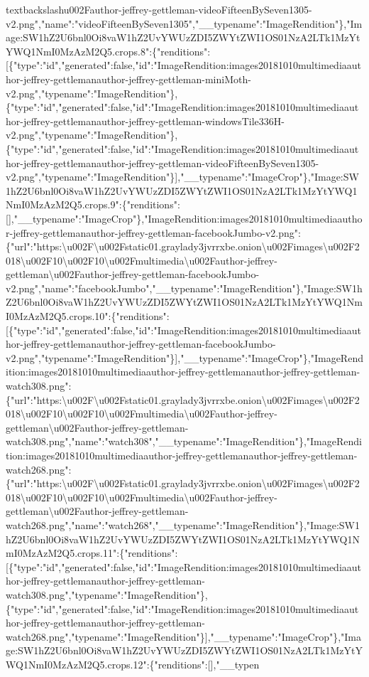 textbackslash{}u002Fauthor-jeffrey-gettleman-videoFifteenBySeven1305-v2.png","name":"videoFifteenBySeven1305","\_\_typename":"ImageRendition"\},"Image:SW1hZ2U6bnl0Oi8vaW1hZ2UvYWUzZDI5ZWYtZWI1OS01NzA2LTk1MzYtYWQ1NmI0MzAzM2Q5.crops.8":\{"renditions":{[}\{"type":"id","generated":false,"id":"ImageRendition:images20181010multimediaauthor-jeffrey-gettlemanauthor-jeffrey-gettleman-miniMoth-v2.png","typename":"ImageRendition"\},\{"type":"id","generated":false,"id":"ImageRendition:images20181010multimediaauthor-jeffrey-gettlemanauthor-jeffrey-gettleman-windowsTile336H-v2.png","typename":"ImageRendition"\},\{"type":"id","generated":false,"id":"ImageRendition:images20181010multimediaauthor-jeffrey-gettlemanauthor-jeffrey-gettleman-videoFifteenBySeven1305-v2.png","typename":"ImageRendition"\}{]},"\_\_typename":"ImageCrop"\},"Image:SW1hZ2U6bnl0Oi8vaW1hZ2UvYWUzZDI5ZWYtZWI1OS01NzA2LTk1MzYtYWQ1NmI0MzAzM2Q5.crops.9":\{"renditions":{[}{]},"\_\_typename":"ImageCrop"\},"ImageRendition:images20181010multimediaauthor-jeffrey-gettlemanauthor-jeffrey-gettleman-facebookJumbo-v2.png":\{"url":"https:\textbackslash{}u002F\textbackslash{}u002Fstatic01.graylady3jvrrxbe.onion\textbackslash{}u002Fimages\textbackslash{}u002F2018\textbackslash{}u002F10\textbackslash{}u002F10\textbackslash{}u002Fmultimedia\textbackslash{}u002Fauthor-jeffrey-gettleman\textbackslash{}u002Fauthor-jeffrey-gettleman-facebookJumbo-v2.png","name":"facebookJumbo","\_\_typename":"ImageRendition"\},"Image:SW1hZ2U6bnl0Oi8vaW1hZ2UvYWUzZDI5ZWYtZWI1OS01NzA2LTk1MzYtYWQ1NmI0MzAzM2Q5.crops.10":\{"renditions":{[}\{"type":"id","generated":false,"id":"ImageRendition:images20181010multimediaauthor-jeffrey-gettlemanauthor-jeffrey-gettleman-facebookJumbo-v2.png","typename":"ImageRendition"\}{]},"\_\_typename":"ImageCrop"\},"ImageRendition:images20181010multimediaauthor-jeffrey-gettlemanauthor-jeffrey-gettleman-watch308.png":\{"url":"https:\textbackslash{}u002F\textbackslash{}u002Fstatic01.graylady3jvrrxbe.onion\textbackslash{}u002Fimages\textbackslash{}u002F2018\textbackslash{}u002F10\textbackslash{}u002F10\textbackslash{}u002Fmultimedia\textbackslash{}u002Fauthor-jeffrey-gettleman\textbackslash{}u002Fauthor-jeffrey-gettleman-watch308.png","name":"watch308","\_\_typename":"ImageRendition"\},"ImageRendition:images20181010multimediaauthor-jeffrey-gettlemanauthor-jeffrey-gettleman-watch268.png":\{"url":"https:\textbackslash{}u002F\textbackslash{}u002Fstatic01.graylady3jvrrxbe.onion\textbackslash{}u002Fimages\textbackslash{}u002F2018\textbackslash{}u002F10\textbackslash{}u002F10\textbackslash{}u002Fmultimedia\textbackslash{}u002Fauthor-jeffrey-gettleman\textbackslash{}u002Fauthor-jeffrey-gettleman-watch268.png","name":"watch268","\_\_typename":"ImageRendition"\},"Image:SW1hZ2U6bnl0Oi8vaW1hZ2UvYWUzZDI5ZWYtZWI1OS01NzA2LTk1MzYtYWQ1NmI0MzAzM2Q5.crops.11":\{"renditions":{[}\{"type":"id","generated":false,"id":"ImageRendition:images20181010multimediaauthor-jeffrey-gettlemanauthor-jeffrey-gettleman-watch308.png","typename":"ImageRendition"\},\{"type":"id","generated":false,"id":"ImageRendition:images20181010multimediaauthor-jeffrey-gettlemanauthor-jeffrey-gettleman-watch268.png","typename":"ImageRendition"\}{]},"\_\_typename":"ImageCrop"\},"Image:SW1hZ2U6bnl0Oi8vaW1hZ2UvYWUzZDI5ZWYtZWI1OS01NzA2LTk1MzYtYWQ1NmI0MzAzM2Q5.crops.12":\{"renditions":{[}{]},"\_\_typen